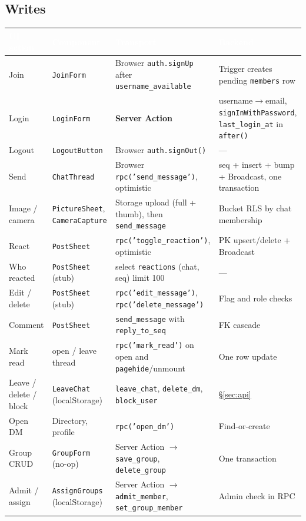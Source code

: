 \documentclass[11pt,a4paper]{article}
\newcommand{\hdr}[1]{\textcolor{white}{\textbf{#1}}}
\newcommand{\code}[1]{\texttt{\small #1}}
\begin{document}
\subsection{Writes}
{\small
{}
\begin{longtable}{L{2.6cm} L{3.4cm} L{4.6cm} L{4.2cm}}
\hdr{UI action} & \hdr{Component} & \hdr{Transport} & \hdr{Backend}\\
\endhead
Join & \code{JoinForm} & Browser \code{auth.signUp} after \code{username\_available} & Trigger creates pending \code{members} row\\
Login & \code{LoginForm} & \textbf{Server Action} & username$\rightarrow$email, \code{signInWithPassword}, \code{last\_login\_at} in \code{after()}\\
Logout & \code{LogoutButton} & Browser \code{auth.signOut()} & ---\\
Send & \code{ChatThread} & Browser \code{rpc('send\_message')}, optimistic & seq + insert + bump + Broadcast, one transaction\\
Image / camera & \code{PictureSheet}, \code{CameraCapture} & Storage upload (full + thumb), then \code{send\_message} & Bucket RLS by chat membership\\
React & \code{PostSheet} & \code{rpc('toggle\_reaction')}, optimistic & PK upsert/delete + Broadcast\\
Who reacted & \code{PostSheet} (stub) & select \code{reactions} (chat, seq) limit 100 & ---\\
Edit / delete & \code{PostSheet} (stub) & \code{rpc('edit\_message')}, \code{rpc('delete\_message')} & Flag and role checks\\
Comment & \code{PostSheet} & \code{send\_message} with \code{reply\_to\_seq} & FK cascade\\
Mark read & open / leave thread & \code{rpc('mark\_read')} on open and \code{pagehide}/unmount & One row update\\
Leave / delete / block & \code{LeaveChat} (localStorage) & \code{leave\_chat}, \code{delete\_dm}, \code{block\_user} & \S\ref{sec:api}\\
Open DM & Directory, profile & \code{rpc('open\_dm')} & Find-or-create\\
Group CRUD & \code{GroupForm} (no-op) & Server Action $\rightarrow$ \code{save\_group}, \code{delete\_group} & One transaction\\
Admit / assign & \code{AssignGroups} (localStorage) & Server Action $\rightarrow$ \code{admit\_member}, \code{set\_group\_member} & Admin check in RPC\\

\end{longtable}}
\end{document}
